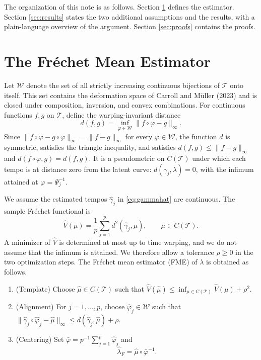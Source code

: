 \documentclass[11pt]{article}
\newcommand{\T}{\mathcal{T}}
\newcommand{\W}{\mathcal{W}}
\newcommand{\lhat}{\hat{\lambda}}
\newcommand{\ghat}{\hat{\gamma}}
\newcommand{\muhat}{\hat{\mu}}
\newcommand{\phihat}{\hat{\varphi}}
\newcommand{\norm}[1]{\|#1\|_\infty}
\begin{document}
The organization of this note is as follows. Section \ref{sec:est} defines the estimator.
Section \ref{sec:results} states the two additional assumptions and the results, with a
plain-language overview of the argument. Section \ref{sec:proofs} contains the proofs.

\section{The Fr\'echet Mean Estimator}
\label{sec:est}

Let $\W$ denote the set of all strictly increasing continuous bijections of $\T$ onto
itself. This set contains the deformation space of Carroll and M\"{u}ller (2023) and is
closed under composition, inversion, and convex combinations. For continuous functions
$f, g$ on $\T$, define the warping-invariant distance
\begin{equation}
  d(f, g) = \inf_{\varphi \in \W} \norm{f \circ \varphi - g}.
  \label{eq:d}
\end{equation}
Since $\norm{f\circ\varphi - g\circ\varphi} = \norm{f - g}$ for every $\varphi \in \W$, the
function $d$ is symmetric, satisfies the triangle inequality, and satisfies
$d(f,g) \le \norm{f-g}$ and $d(f\circ\varphi, g) = d(f,g)$. It is a pseudometric on $C(\T)$
under which each tempo is at distance zero from the latent curve: $d(\gamma_j, \lambda) = 0$,
with the infimum attained at $\varphi = \Psi_j^{-1}$.

We assume the estimated tempos $\ghat_j$ in \eqref{eq:gammahat} are continuous. The sample Fr\'echet functional is
\[
  \hat{V}(\mu) = \frac{1}{p}\sum_{j=1}^p d^2(\ghat_j, \mu), \qquad \mu \in C(\T).
\]
A minimizer of $\hat{V}$ is determined at most up to time warping, and we do not assume that
the infimum is attained. We therefore allow a tolerance $\rho \ge 0$ in the two optimization
steps. The Fr\'echet mean estimator (FME) of $\lambda$ is obtained as follows.

\begin{enumerate}
  \item[Step 1.] (Template) Choose $\muhat \in C(\T)$ such that
    $\hat{V}(\muhat) \le \inf_{\mu \in C(\T)} \hat{V}(\mu) + \rho^2$.
  \item[Step 2.] (Alignment) For $j = 1,\ldots,p$, choose $\phihat_j \in \W$ such that
    $\norm{\ghat_j\circ\phihat_j - \muhat} \le d(\ghat_j, \muhat) + \rho$.
  \item[Step 3.] (Centering) Set $\bar{\varphi} = p^{-1}\sum_{j=1}^p \phihat_j$ and
    \begin{equation}
      \lhat_F = \muhat \circ \bar{\varphi}^{-1}.
      \label{eq:fme}
    \end{equation}
\end{enumerate}
\end{document}
